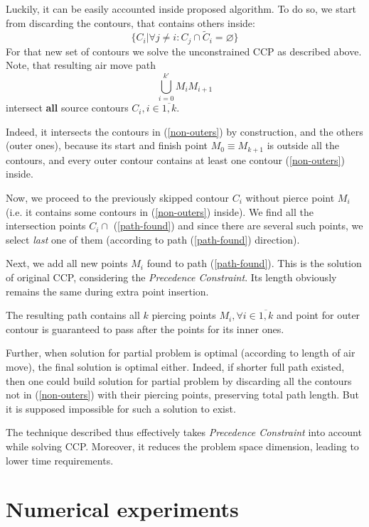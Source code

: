 \documentclass{ifacconf}
\begin{document}
Luckily, it can be easily accounted
inside proposed algorithm.
To do so,
we start from discarding the contours,
that contains others inside:
\begin{equation}
\big\{
    C_i | \forall j \ne i: C_j \cap \tilde C_i = \varnothing
\big\}
\label{non-outers}
\end{equation}
For that new set of contours
we solve the unconstrained CCP
as described above.
Note, that resulting air move path
\begin{equation}
  \bigcup_{i=0}^{k'} M_i M_{i+1}
\label{path-found}
\end{equation}
intersect \textbf{all}
source contours
$C_i, i \in \overline{1,k}$.

Indeed,
it intersects the contours in (\ref{non-outers})
by construction,
and the others
(outer ones),
because
its start and finish point
$M_0 \equiv M_{k+1}$
is outside all the contours,
and every outer contour
contains at least one contour
(\ref{non-outers}) inside.

Now,
we proceed to the
previously skipped contour $C_i$
without pierce point $M_i$
(i.e. it contains some contours in
(\ref{non-outers}) inside).
We find all the intersection
points $C_i \cap $ (\ref{path-found})
and since there are several such points,
we select \textit{last} one of them
(according to path (\ref{path-found}) direction).

Next, we add all new points $M_i$ found
to path (\ref{path-found}).
This is the solution of original CCP,
considering the
\textit{Precedence Constraint}.
Its length obviously remains the same
during extra point insertion.

The resulting path contains all $k$
piercing points
$M_i, \forall i \in \overline{1,k}$
and point for outer contour
is guaranteed to pass after
the points for its inner ones.

Further,
when solution for partial problem
is optimal
(according to length of air move),
the final solution
is optimal either.
Indeed,
if shorter full path existed,
then one could build solution
for partial problem
by discarding all the contours not in
(\ref{non-outers}) with their piercing points,
preserving total path length.
But it is supposed impossible
for such a solution to exist.

The technique described thus
effectively takes
\textit{Precedence Constraint}
into account while solving CCP.
Moreover,
it reduces the problem space dimension,
leading to lower time requirements.

\section{Numerical experiments}
\end{document}
